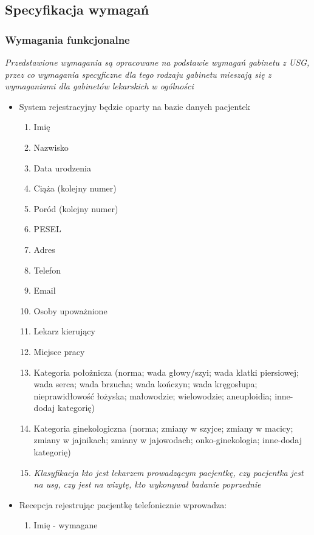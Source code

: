 \documentclass[polish,12pt]{aghthesis}
\begin{document}
\subsection{Specyfikacja wymagań}

\subsubsection{Wymagania funkcjonalne}
\small\emph{Przedstawione wymagania są opracowane na podstawie wymagań gabinetu z USG, przez co wymagania specyficzne dla tego rodzaju gabinetu mieszają się z  wymaganiami dla gabinetów lekarskich w ogólności}
\begin{itemize}
    \item System rejestracyjny będzie oparty na bazie danych pacjentek \begin{enumerate}
      \item Imię
      \item Nazwisko
      \item Data urodzenia
      \item Ciąża (kolejny numer)
      \item Poród (kolejny numer)
      \item PESEL
      \item Adres
      \item Telefon
      \item Email
      \item Osoby upoważnione
      \item Lekarz kierujący
      \item Miejsce pracy
      \item Kategoria położnicza (norma; wada głowy/szyi; wada klatki piersiowej; wada serca; wada brzucha; wada kończyn; wada kręgosłupa; nieprawidłowość łożyska; małowodzie; wielowodzie; aneuploidia; inne-dodaj kategorię)
      \item Kategoria ginekologiczna (norma; zmiany w szyjce; zmiany w macicy; zmiany w jajnikach; zmiany w jajowodach; onko-ginekologia; inne-dodaj kategorię)
      \item \emph{Klasyfikacja kto jest lekarzem prowadzącym pacjentkę, czy pacjentka jest na usg, czy jest na wizytę, kto wykonywał badanie poprzednie}
    \end{enumerate}
    \item Recepcja rejestrując pacjentkę telefonicznie wprowadza: \begin{enumerate}
      \item Imię - wymagane

\end{enumerate}
\end{itemize}
\end{document}
